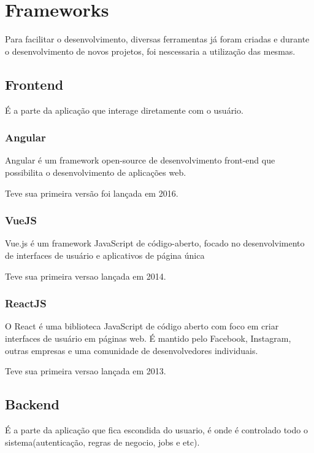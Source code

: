 \section{Frameworks}

Para facilitar o desenvolvimento, diversas ferramentas já foram criadas e durante o desenvolvimento de novos projetos, foi nescessaria a utilização das mesmas.

\subsection{Frontend}

É a parte da aplicação que interage diretamente com o usuário.

\subsubsection{Angular}

Angular é um framework open-source de desenvolvimento front-end que possibilita o desenvolvimento de aplicações web.

Teve sua primeira versão foi lançada em 2016.

\subsubsection{VueJS}

Vue.js é um framework JavaScript de código-aberto, focado no desenvolvimento de interfaces de usuário e aplicativos de página única

Teve sua primeira versao lançada em 2014.

\subsubsection{ReactJS}

O React é uma biblioteca JavaScript de código aberto com foco em criar interfaces de usuário em páginas web. É mantido pelo Facebook, Instagram, outras empresas e uma comunidade de desenvolvedores individuais. 

Teve sua primeira versao lançada em 2013.

\subsection{Backend}

É a parte da aplicação que fica escondida do usuario, é onde é controlado todo o sistema(autenticação, regras de negocio, jobs e etc).

